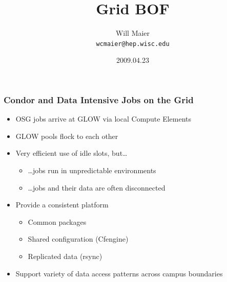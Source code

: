 \documentclass{beamer}
\title{Grid BOF}
\author[Maier]{
    Will Maier\\
    {\tt wcmaier@hep.wisc.edu}}
\institute[Wisconsin]{University of Wisconsin - High Energy Physics}
\date{2009.04.23}
\begin{document}


\begin{frame}
\frametitle{Condor and Data Intensive Jobs on the Grid}
\begin{itemize}
	\item OSG jobs arrive at GLOW via local Compute Elements
	\item GLOW pools flock to each other
	\item Very efficient use of idle slots, but\ldots{}
	\begin{itemize}
		\item \ldots{}jobs run in unpredictable environments
		\item \ldots{}jobs and their data are often disconnected
	\end{itemize}
	\item Provide a consistent platform
	\begin{itemize}
		\item Common packages
		\item Shared configuration (Cfengine)
		\item Replicated data (rsync)
	\end{itemize}
	\item Support variety of data access patterns across campus boundaries
\end{itemize}
\end{frame}
\end{document}
